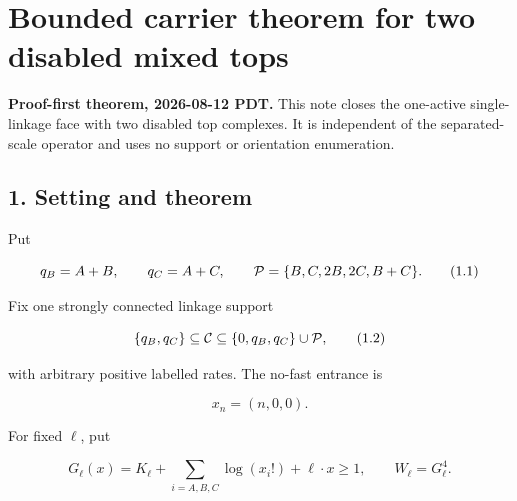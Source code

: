 \section{Bounded carrier theorem for two disabled mixed
tops}

\textbf{Proof-first theorem, 2026-08-12 PDT.} This note closes the
one-active single-linkage face with two disabled top complexes. It is
independent of the separated-scale operator and uses no support or
orientation enumeration.

\subsection{1. Setting and theorem}

Put

\[
 q_B=A+B,\qquad q_C=A+C,\qquad
 {\cal P}=\{B,C,2B,2C,B+C\}.                                 \tag{1.1}
\]

Fix one strongly connected linkage support

\[
 \{q_B,q_C\}\subseteq{\cal C}
      \subseteq\{0,q_B,q_C\}\cup{\cal P},                    \tag{1.2}
\]

with arbitrary positive labelled rates. The no-fast entrance is

\[
                              x_n=(n,0,0).                     \tag{1.3}
\]

For fixed \(\ell\), put

\[
 G_\ell(x)=K_\ell+\sum_{i=A,B,C}\log(x_i!)+\ell\cdot x\ge1,
 \qquad W_\ell=G_\ell^4.                                     \tag{1.4}
\]

